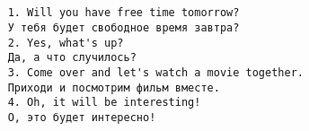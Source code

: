 \subsection*{}
\begin{verbatim}
    1. Will you have free time tomorrow?
    У тебя будет свободное время завтра?
    2. Yes, what's up?
    Да, а что случилось?
    3. Come over and let's watch a movie together.
    Приходи и посмотрим фильм вместе.
    4. Oh, it will be interesting!
    О, это будет интересно!
\end{verbatim}